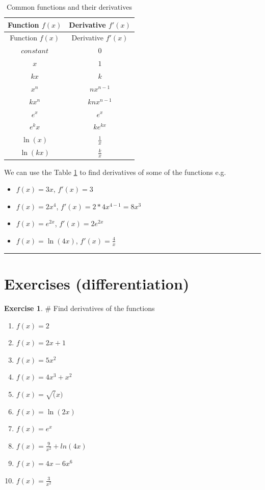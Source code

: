 \documentclass[
]{book}
\providecommand{\tightlist}{%
  \setlength{\itemsep}{0pt}\setlength{\parskip}{0pt}}
\theoremstyle{definition}
\theoremstyle{definition}
\theoremstyle{definition}
\newtheorem{exercise}{Exercise}[chapter]
\theoremstyle{remark}
\begin{document}
\begin{longtable}[]{@{}cc@{}}
\caption{\label{tab:diff-table} Common functions and their derivatives}\tabularnewline
\toprule
Function \(f(x)\) & Derivative \(f'(x)\)\tabularnewline
\midrule
\endfirsthead
\toprule
Function \(f(x)\) & Derivative \(f'(x)\)\tabularnewline
\midrule
\endhead
\(constant\) & \(0\)\tabularnewline
\(x\) & \(1\)\tabularnewline
\(kx\) & \(k\)\tabularnewline
\(x^n\) & \(nx^{n-1}\)\tabularnewline
\(kx^n\) & \(knx^{n-1}\)\tabularnewline
\(e^x\) & \(e^x\)\tabularnewline
\(e^kx\) & \(ke^{kx}\)\tabularnewline
\(\ln(x)\) & \(\frac{1}{x}\)\tabularnewline
\(\ln(kx)\) & \(\frac{k}{x}\)\tabularnewline
\bottomrule
\end{longtable}

We can use the Table \ref{tab:diff-table} to find derivatives of some of the functions e.g.

\begin{itemize}
\tightlist
\item
  \(f(x) = 3x\), \(f'(x) = 3\)
\item
  \(f(x) = 2x^4\), \(f'(x) = 2*4x^{4-1} = 8x^3\)
\item
  \(f(x) = e^{2x}\), \(f'(x) = 2e^{2x}\)
\item
  \(f(x) = \ln(4x)\), \(f'(x) = \frac{4}{x}\)
\end{itemize}

\begin{center}\rule{0.5\linewidth}{0.5pt}\end{center}

\hypertarget{exercises-differentiation}{%
\section{Exercises (differentiation)}\label{exercises-differentiation}}

\begin{exercise}
\protect\hypertarget{exr:m-diff}{}{\label{exr:m-diff} }
\# Find derivatives of the functions

\begin{enumerate}
\def\labelenumi{\alph{enumi})}
\tightlist
\item
  \(f(x) = 2\)
\item
  \(f(x) = 2x + 1\)
\item
  \(f(x) = 5x^2\)
\item
  \(f(x) = 4x^3 + x^2\)
\item
  \(f(x) = \sqrt(x)\)
\item
  \(f(x) = \ln(2x)\)
\item
  \(f(x) = e^{x}\)
\item
  \(f(x) = \frac{9}{x^2} + ln(4x)\)
\item
  \(f(x) = 4x−6x^6\)
\item
  \(f(x) = \frac{3}{x^2}\)
\end{enumerate}
\end{exercise}
\end{document}
